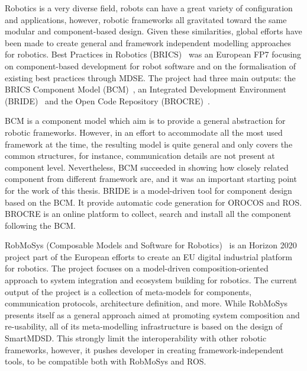 Robotics is a very diverse field, robots can have a great variety of configuration and applications, however, robotic frameworks all gravitated toward the same modular and component-based design. Given these similarities, global efforts have been made to create general and framework independent modelling approaches for robotics. Best Practices in Robotics (BRICS)~\cite{bischoff2010brics} was an European FP7 focusing on component-based development for robot software and on the formalisation of existing best practices through MDSE. The project had three main outputs: the BRICS Component Model (BCM)~\cite{bruyninckx2013brics}, an Integrated Development Environment (BRIDE)~\cite{bubeck2014bride} and the Open Code Repository (BROCRE)~\cite{kraetzschmar2010specifications}.

BCM is a component model which aim is to provide a general abstraction for robotic frameworks. However, in an effort to accommodate all the most used framework at the time, the resulting model is quite general and only covers the common structures, for instance, communication details are not present at component level. Nevertheless, BCM succeeded in showing how closely related component from different framework are, and it was an important starting point for the work of this thesis. BRIDE is a model-driven tool for component design based on the BCM. It provide automatic code generation for OROCOS and ROS. BROCRE is an online platform to collect, search and install all the component following the BCM.

RobMoSys (Composable Models and Software for Robotics)~\cite{robmosys} is an Horizon 2020 project part of the European efforts to create an EU digital industrial platform for robotics. The project focuses on a model-driven composition-oriented approach to system integration and ecosystem building for robotics. The current output of the project is a collection of meta-models for components, communication protocols, architecture definition, and more. While RobMoSys presents itself as a general approach aimed at promoting system composition and re-usability, all of its meta-modelling infrastructure is based on the design of SmartMDSD. This strongly limit the interoperability with other robotic frameworks, however, it pushes developer in creating framework-independent tools, to be compatible both with RobMoSys and ROS.

